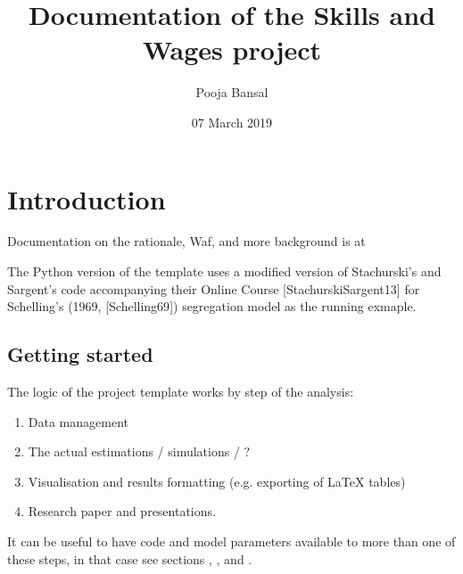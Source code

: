 \documentclass[a4paper,11pt,english]{sphinxmanual}
\title{Documentation of the Skills and Wages project}
\date{07 March 2019}
\author{Pooja Bansal}
\begin{document}
\pagestyle{empty}
\maketitle
\pagestyle{plain}
\sphinxtableofcontents
\pagestyle{normal}
\label{\detokenize{index::doc}}



\chapter{Introduction}
\label{\detokenize{introduction:introduction}}\label{\detokenize{introduction:id1}}\label{\detokenize{introduction::doc}}
Documentation on the rationale, Waf, and more background is at 

The Python version of the template uses a modified version of Stachurski’s and Sargent’s code accompanying their Online Course {[}StachurskiSargent13{]} for Schelling’s (1969, {[}Schelling69{]}) segregation model as the running exmaple.


\section{Getting started}
\label{\detokenize{introduction:getting-started}}\label{\detokenize{introduction:id4}}
  

The logic of the project template works by step of the analysis:
\begin{enumerate}
\def\theenumi{\arabic{enumi}}
\def\labelenumi{\theenumi .}
\makeatletter\def\p@enumii{\p@enumi \theenumi .}\makeatother
\item {} 
Data management

\item {} 
The actual estimations / simulations / ?

\item {} 
Visualisation and results formatting (e.g. exporting of LaTeX tables)

\item {} 
Research paper and presentations.

\end{enumerate}

It can be useful to have code and model parameters available to more than one of these steps, in that case see sections , , and {\hyperref[\detokenize{library:library}]{}}.
\end{document}
